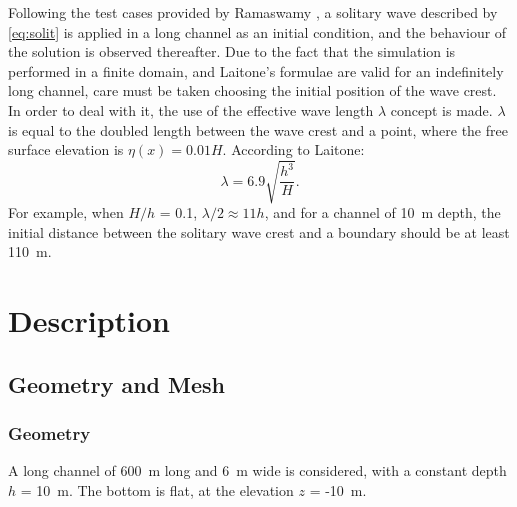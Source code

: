 Following the test cases provided by Ramaswamy \cite{Ramaswamy1990}, a solitary wave described by
\eqref{eq:solit} is applied in a long channel as an initial condition, and the
behaviour of the solution is observed thereafter. Due to the fact that the simulation is
performed in a finite domain, and Laitone’s formulae are valid for an indefinitely long
channel, care must be taken choosing the initial position of the wave crest. In order to
deal with it, the use of the effective wave length $\lambda$ concept is made. $\lambda$ is equal to the
doubled length between the wave crest and a point, where the free surface elevation is
$\eta(x) = 0.01H$. According to Laitone:
\begin{equation}
\lambda = 6.9\sqrt{\dfrac{h^3}{H}}.
\end{equation}
For example, when $H/h$ = 0.1, $\lambda/2 \approx 11h$, and for a channel of
10~m depth, the initial distance between the solitary wave crest and a boundary
should be at least 110~m.

\section{Description}
%
%
%
\subsection{Geometry and Mesh}

\subsubsection{Geometry}
A long channel of 600~m long and 6~m wide is considered, with a constant depth $h$ = 10~m.
The bottom is flat, at the elevation $z$ = -10~m.

